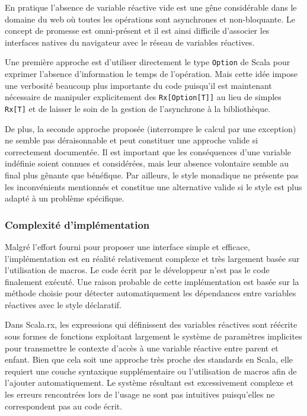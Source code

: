 	En pratique l'absence de variable réactive vide est une gêne considérable dans le domaine du web où toutes les opérations sont asynchrones et non-bloquante. Le concept de promesse est omni-présent et il est ainsi difficile d'associer les interfaces natives du navigateur avec le réseau de variables réactives.
	
	Une première approche est d'utiliser directement le type \texttt{Option} de Scala pour exprimer l'absence d'information le temps de l'opération. Mais cette idée impose une verbosité beaucoup plus importante du code puisqu'il est maintenant nécessaire de manipuler explicitement des \texttt{Rx[Option[T]]} au lieu de simples \texttt{Rx[T]} et de laisser le soin de la gestion de l'asynchrone à la bibliothèque.
	
	De plus, la seconde approche proposée (interrompre le calcul par une exception) ne semble pas déraisonnable et peut constituer une approche valide si correctement documentée. Il est important que les conséquences d'une variable indéfinie soient connues et considérées, mais leur absence volontaire semble au final plus gênante que bénéfique. Par ailleurs, le style monadique ne présente pas les inconvénients mentionnés et constitue une alternative valide si le style est plus adapté à un problème spécifique.
	
	\subsubsection{Complexité d'implémentation}
	
	Malgré l'effort fourni pour proposer une interface simple et efficace, l'implémentation est en réalité relativement complexe et très largement basée sur l'utilisation de macros. Le code écrit par le développeur n'est pas le code finalement exécuté. Une raison probable de cette implémentation est basée sur la méthode choisie pour détecter automatiquement les dépendances entre variables réactives avec le style déclaratif.
	
	Dans Scala.rx, les expressions qui définissent des variables réactives sont réécrite sous formes de fonctions exploitant largement le système de paramètres implicites pour transmettre le contexte d'accès à une variable réactive entre parent et enfant. Bien que cela soit une approche très proche des standards en Scala, elle requiert une couche syntaxique supplémentaire ou l'utilisation de macros afin de l'ajouter automatiquement. Le système résultant est excessivement complexe et les erreurs rencontrées lors de l'usage ne sont pas intuitives puisqu'elles ne correspondent pas au code écrit. 
	
